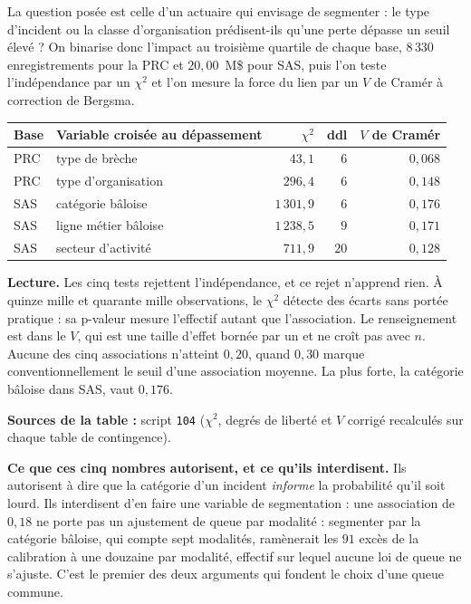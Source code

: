 La question posée est celle d'un actuaire qui envisage de segmenter : le type d'incident ou la
classe d'organisation prédisent-ils qu'une perte dépasse un seuil élevé ? On binarise donc
l'impact au troisième quartile de chaque base, $8\,330$ enregistrements pour la PRC et
$20{,}00$~M\$ pour SAS, puis l'on teste l'indépendance par un $\chi^2$ et l'on mesure la force du
lien par un $V$ de Cramér à correction de Bergsma.

\begin{center}\small
\renewcommand{\arraystretch}{1.15}
\begin{tabular}{@{}l l r r r@{}}
\toprule
\textbf{Base} & \textbf{Variable croisée au dépassement} & \textbf{$\chi^2$} & \textbf{ddl} &
\textbf{$V$ de Cramér} \\
\midrule
PRC & type de brèche              & $43{,}1$     & $6$  & $0{,}068$ \\
PRC & type d'organisation         & $296{,}4$    & $6$  & $0{,}148$ \\
\midrule
SAS & catégorie bâloise           & $1\,301{,}9$ & $6$  & $0{,}176$ \\
SAS & ligne métier bâloise        & $1\,238{,}5$ & $9$  & $0{,}171$ \\
SAS & secteur d'activité          & $711{,}9$    & $20$ & $0{,}128$ \\
\bottomrule
\end{tabular}
\end{center}

\vspace{2pt}
\noindent\textbf{Lecture.} Les cinq tests rejettent l'indépendance, et ce rejet n'apprend rien.
À quinze mille et quarante mille observations, le $\chi^2$ détecte des écarts sans portée
pratique : sa p-valeur mesure l'effectif autant que l'association. Le renseignement est dans le
$V$, qui est une taille d'effet bornée par un et ne croît pas avec $n$. Aucune des cinq
associations n'atteint $0{,}20$, quand $0{,}30$ marque conventionnellement le seuil d'une
association moyenne. La plus forte, la catégorie bâloise dans SAS, vaut $0{,}176$.

\noindent\textbf{Sources de la table :} script \texttt{104} ($\chi^2$, degrés de liberté et $V$
corrigé recalculés sur chaque table de contingence).

\begin{cle}
\textbf{Ce que ces cinq nombres autorisent, et ce qu'ils interdisent.} Ils autorisent à dire que
la catégorie d'un incident \emph{informe} la probabilité qu'il soit lourd. Ils interdisent d'en
faire une variable de segmentation : une association de $0{,}18$ ne porte pas un ajustement de queue par
modalité : segmenter par la catégorie bâloise, qui compte sept modalités, ramènerait les $91$
excès de la calibration à une douzaine par modalité, effectif sur lequel aucune loi de queue ne
s'ajuste. C'est le premier des deux arguments qui fondent le choix d'une queue commune.
\end{cle}

